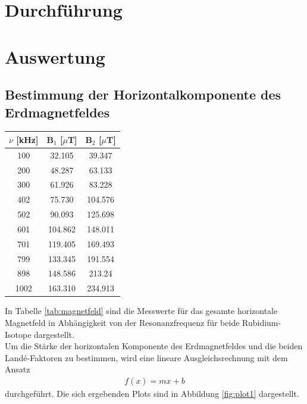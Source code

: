 \documentclass[]{scrartcl}
\begin{document}
\section{Durchführung}

\section{Auswertung}

\subsection{Bestimmung der Horizontalkomponente des Erdmagnetfeldes}

\begin{center}
	\begin{tabular}{|c|c|c|}
	\hline $\nu$ [kHz] & B$_1$ [$\mu$T] & B$_2$ [$\mu$T] \\
	\hline	100	&	32.105	&	39.347	\\
	\hline	200	&	48.287	&	63.133	\\
	\hline	300	&	61.926	&	83.228	\\
	\hline	402	&	75.730	&	104.576	\\
	\hline	502	&	90.093	&	125.698	\\
	\hline	601	&	104.862	&	148.011	\\
	\hline	701	&	119.405	&	169.493	\\
	\hline	799	&	133.345	&	191.554	\\
	\hline	898	&	148.586	&	213.24	\\
	\hline	1002	&	163.310	&	234.913	\\
	\hline 
	\end{tabular}
\label{tab:magnetfeld}
\end{center}
In Tabelle \ref{tab:magnetfeld} sind die Messwerte für das gesamte horizontale Magnetfeld in Abhängigkeit von der Resonanzfrequenz für beide Rubidium-Isotope dargestellt. \\
Um die Stärke der horizontalen Komponente des Erdmagnetfeldes und die beiden Landé-Faktoren zu bestimmen, wird eine lineare Ausgleichsrechnung mit dem Ansatz
\begin{align}
f(x)=mx+b
\end{align}
durchgeführt. Die sich ergebenden Plots sind in Abbildung \ref{fig:plot1} dargestellt.
\end{document}
